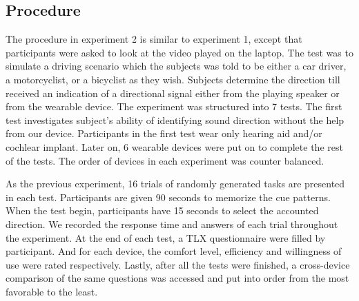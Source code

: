 \documentclass{sigchi}
\begin{document}
\subsection{Procedure}
The procedure in experiment 2 is similar to experiment 1, except that participants were asked to look at the video played on the laptop. The test was to simulate a driving scenario which the subjects was told to be either a car driver, a motorcyclist, or a bicyclist as they wish. Subjects determine the direction till received an indication of a directional signal either from the playing speaker or from the wearable device. The experiment was structured into 7 tests. The first test investigates subject's ability of identifying sound direction without the help from our device. Participants in the first test wear only hearing aid and/or cochlear implant. Later on, 6 wearable devices were put on to complete the rest of the tests. The order of devices in each experiment was counter balanced.

As the previous experiment, 16 trials of randomly generated tasks are presented in each test. Participants are given 90 seconds to memorize the cue patterns. When the test begin, participants have 15 seconds to select the accounted direction. We recorded the response time and answers of each trial throughout the experiment. At the end of each test, a TLX questionnaire were filled by participant. And for each device, the comfort level, efficiency and willingness of use were rated respectively. Lastly, after all the tests were finished, a cross-device comparison of the same questions was accessed and put into order from the most favorable to the least.

%
%
\end{document}
